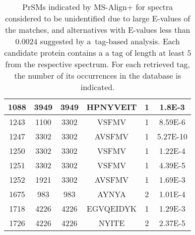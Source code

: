 \documentclass{article}[12pt]
\begin{document}
\begin{landscape}
\begin{table}[h]
{\begin{center}
\begin{tabular}{|c|c||c|c|c|c|}
  \hline
1088& 3949 & 
3949
 & 
HPNYVEIT & 1 & 1.8E-3\\
  \hline
1243& 1100 & 
3302
 & 
VSFMV & 1 & 8.59E-6\\
  \hline
1247& 3302 & 
3302
 & 
AVSFMV & 1 & 5.27E-10\\
  \hline
1250& 3302 & 
3302
 & 
VSFMV & 1 & 1.22E-4\\
  \hline
1251& 3302 & 
3302
 & 
VSFMV & 1 & 4.39E-5\\
  \hline
1252& 1921 & 
3302
 & 
AVSFMV & 1 & 1.69E-3\\
  \hline
1675& 983 & 
983
 & 
AYNYA & 2 & 1.01E-4\\
  \hline
1718& 4226 & 
4226
 & 
EGVQEIDYK & 1 & 1.29E-3\\
  \hline
1726& 4226 & 
4226
 & 
NYITE & 2 & 2.37E-5\\
\hline\end{tabular}
\end{center}
\par}
\centering
\caption{PrSMs indicated by MS-Align+ for spectra considered to be unidentified due to large E-values of the matches, and alternatives with E-values less than $0.0024$ suggested by a~tag-based analysis. Each candidate protein contains a a tag of length at least $5$ from the respective spectrum. For each retrieved tag, the number of its occurrences in the database is indicated.}
\vspace{3mm}
\label{table:unident-spectra}
\end{table}






\end{landscape}
\end{document}
